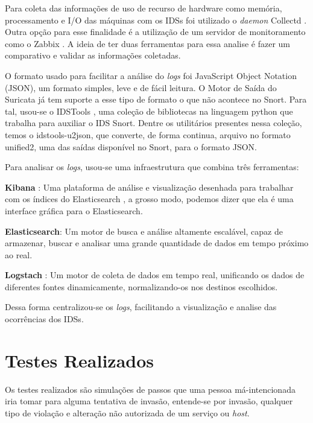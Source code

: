 Para coleta das informações de uso de recurso de hardware como memória, processamento e I/O das máquinas com os IDSs foi utilizado o \textit{daemon} Collectd \cite{collectd}. Outra opção para esse finalidade é a utilização de um servidor de monitoramento como o Zabbix \cite{zabbix}. A ideia de ter duas ferramentas para essa analise é fazer um comparativo e validar as informações coletadas.

O formato usado para facilitar a análise do \textit{logs} foi JavaScript Object Notation (JSON), um formato simples, leve e de fácil leitura. O Motor de Saída do Suricata já tem suporte a esse tipo de formato o que não acontece no Snort. Para tal, usou-se o IDSTools \cite{py-idstools}, uma coleção de bibliotecas na linguagem python que trabalha para auxiliar o IDS Snort. Dentre os utilitários presentes nessa coleção, temos o idstools-u2json, que converte, de forma continua, arquivo no formato unified2, uma das saídas disponível no Snort, para o formato JSON.

Para analisar os \textit{logs}, usou-se uma infraestrutura que combina três ferramentas:

\begin{alineas}
\item \textbf{Kibana} \cite{kibana}: Uma plataforma de análise e visualização desenhada para trabalhar com os índices do Elasticsearch \cite{elasticsearch}, a grosso modo, podemos dizer que ela é uma interface gráfica para o Elasticsearch. 
\item \textbf{Elasticsearch}: Um motor de busca e análise altamente escalável, capaz de armazenar, buscar e analisar uma grande quantidade de dados em tempo próximo ao real. 
\item \textbf{Logstach} \cite{logstach}: Um motor de coleta de dados em tempo real, unificando os dados de diferentes fontes dinamicamente, normalizando-os nos destinos escolhidos.
\end{alineas}

Dessa forma centralizou-se os \textit{logs}, facilitando a visualização e analise das ocorrências dos IDSs. 

\section{Testes Realizados} \label{sec:testes}
Os testes realizados são simulações de passos que uma pessoa má-intencionada iria tomar para alguma tentativa de invasão, entende-se por invasão, qualquer tipo de violação e alteração não autorizada de um serviço ou \textit{host}.

